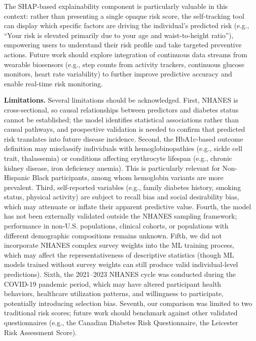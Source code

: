\documentclass{amia}
\begin{document}
The SHAP-based explainability component is particularly valuable in this context: rather than presenting a single opaque risk score, the self-tracking tool can display which specific factors are driving the individual's predicted risk (e.g., ``Your risk is elevated primarily due to your age and waist-to-height ratio''), empowering users to understand their risk profile and take targeted preventive actions. Future work should explore integration of continuous data streams from wearable biosensors (e.g., step counts from activity trackers, continuous glucose monitors, heart rate variability) to further improve predictive accuracy and enable real-time risk monitoring.

\textbf{Limitations.} Several limitations should be acknowledged. First, NHANES is cross-sectional, so causal relationships between predictors and diabetes status cannot be established; the model identifies statistical associations rather than causal pathways, and prospective validation is needed to confirm that predicted risk translates into future disease incidence. Second, the HbA1c-based outcome definition may misclassify individuals with hemoglobinopathies (e.g., sickle cell trait, thalassemia) or conditions affecting erythrocyte lifespan (e.g., chronic kidney disease, iron deficiency anemia).\cite{apa2024} This is particularly relevant for Non-Hispanic Black participants, among whom hemoglobin variants are more prevalent. Third, self-reported variables (e.g., family diabetes history, smoking status, physical activity) are subject to recall bias and social desirability bias, which may attenuate or inflate their apparent predictive value. Fourth, the model has not been externally validated outside the NHANES sampling framework; performance in non-U.S. populations, clinical cohorts, or populations with different demographic compositions remains unknown. Fifth, we did not incorporate NHANES complex survey weights into the ML training process, which may affect the representativeness of descriptive statistics (though ML models trained without survey weights can still produce valid individual-level predictions). Sixth, the 2021--2023 NHANES cycle was conducted during the COVID-19 pandemic period, which may have altered participant health behaviors, healthcare utilization patterns, and willingness to participate, potentially introducing selection bias. Seventh, our comparison was limited to two traditional risk scores; future work should benchmark against other validated questionnaires (e.g., the Canadian Diabetes Risk Questionnaire, the Leicester Risk Assessment Score).
\end{document}
